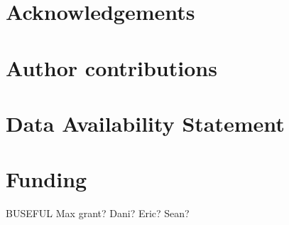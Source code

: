 \documentclass[11pt]{article}
\begin{document}
\begin{spacing}{1.5}




\section{Acknowledgements}

\section{Author contributions}

\section{Data Availability Statement}

\section{Funding}
BUSEFUL
Max grant?
Dani? Eric? Sean? 

\end{spacing}

%


\clearpage

\renewcommand{\thefigure}{S\arabic{figure}}
\renewcommand{\thetable}{S\arabic{table}}
\setcounter{figure}{0}
\setcounter{table}{0}
\onehalfspacing
\linenumbers
\resetlinenumber
\setcounter{secnumdepth}{0}
\setcounter{page}{1}
\setcounter{equation}{0}
\nolinenumbers
{}
\end{document}
